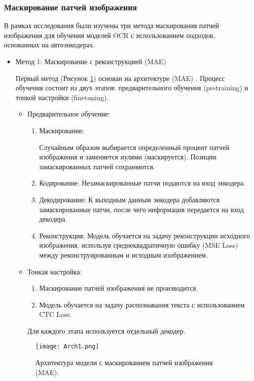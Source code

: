 \subsubsection{Маскирование патчей изображения}
В рамках исследования были изучены три метода маскирования патчей изображения для обучения моделей OCR с использованием подходов, основанных на автоэнкодерах. 
\begin{itemize}
   \item Метод 1: Маскирование с реконструкцией (MAE)
   
     Первый метод (Рисунок \ref{3}) основан на архитектуре (MAE) \cite{he2021masked}. Процесс обучения состоит из двух этапов: предварительного обучения (pretraining) и тонкой настройки (finetuning).
     \begin{itemize}
        \item Предварительное обучение:
        \begin{enumerate}
          \item Маскирование:
          
          Случайным образом выбирается определенный процент патчей изображения и заменяется нулями (маскируется). Позиции замаскированных патчей сохраняются.
          \item Кодирование: Незамаскированные патчи подаются на вход энкодера.
          \item Декодирование: К выходным данным энкодера добавляются замаскированные патчи, после чего информация передается на вход декодера.
          \item Реконструкция: Модель обучается на задачу реконструкции исходного изображения, используя среднеквадратичную ошибку (MSE Loss) между реконструированным и исходным изображением.
        \end{enumerate}
        \item Тонкая настройка:
        \begin{enumerate}
          \item Маскирование патчей изображения не производится.
          \item Модель обучается на задачу распознавания текста с использованием CTC Loss.
        \end{enumerate}

        Для каждого этапа используется отдельный декодер.

     \end{itemize}
     \begin{figure}[H]
        \centering
        \texttt{[image: Arch1.png]}
        \caption{Архитектура модели с маскированием патчей изображения (MAE).}
        \label{3} 
     \end{figure}


\end{itemize}
